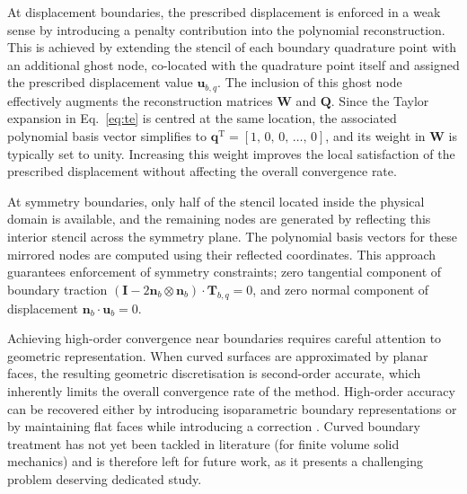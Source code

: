 \documentclass[review,3p]{elsarticle}
\newcommand{\bb}{\boldsymbol}
\begin{document}
At displacement boundaries, the prescribed displacement is enforced in a weak sense by introducing a penalty contribution into the polynomial reconstruction.
This is achieved by extending the stencil of each boundary quadrature point with an additional ghost node, co-located with the quadrature point itself and assigned the prescribed displacement value $\mathbf{u}_{b,q}$.
The inclusion of this ghost node effectively augments the reconstruction matrices $\mathbf{W}$ and $\mathbf{Q}$.
Since the Taylor expansion in Eq.~\eqref{eq:te} is centred at the same location, the associated polynomial basis vector simplifies to
$\mathbf{q}^{\mathrm{T}} = [1,\,0,\,0,\,\dots,\, 0]$, and its weight in $\mathbf{W}$ is typically set to unity.
Increasing this weight improves the local satisfaction of the prescribed displacement without affecting the overall convergence rate.

At symmetry boundaries, only half of the stencil located inside the physical domain is available, and the remaining nodes are generated by reflecting this interior stencil across the symmetry plane. The polynomial basis vectors for these mirrored nodes are computed using their reflected coordinates. This approach guarantees enforcement of symmetry constraints; zero tangential component of boundary traction $(\bb{I}-2\bb{n}_b\otimes\bb{n}_b)\cdot \bb{T}_{b,q}= 0$, and zero normal component of displacement $\bb{n}_b \cdot \bb{u}_b = 0$.

Achieving high-order convergence near boundaries requires careful attention to geometric representation. When curved surfaces are approximated by planar faces, the resulting geometric discretisation is second-order accurate, which inherently limits the overall convergence rate of the method. High-order accuracy can be recovered either by introducing isoparametric boundary representations \cite{Coppeans2026} or by maintaining flat faces while introducing a correction \cite{Costa2022, costa2021,  Gooch2002}. Curved boundary treatment has not yet been tackled in literature (for finite volume solid mechanics) and is therefore left for future work, as it presents a challenging problem deserving dedicated study.
%
\end{document}
